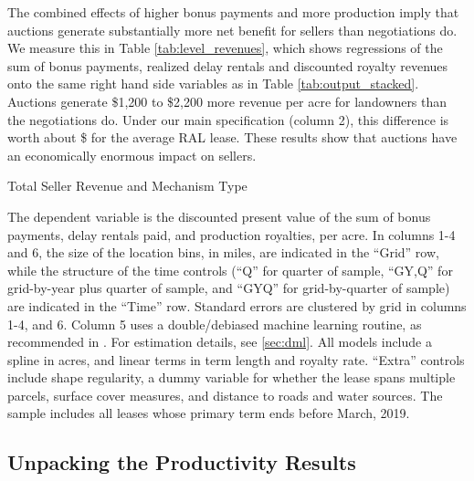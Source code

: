 \documentclass[12pt]{article}
\newcommand{\inputy}[1]{\unskip}
\begin{document}
The combined effects of higher bonus payments and more production imply that auctions generate substantially more net benefit for sellers than negotiations do.  We measure this in Table \ref{tab:level_revenues}, which shows regressions of the sum of bonus payments, realized delay rentals and discounted royalty revenues onto the same right hand side variables as in Table \ref{tab:output_stacked}.  Auctions generate \$1,200 to \$2,200 more revenue per acre for landowners than the negotiations do.  Under our main specification (column 2), this difference is worth about \$\inputy{../output/estimates/SellerRevenue_Grid10Yr_total.tex} for the average RAL lease.  These results show that auctions have an economically enormous impact on sellers.

\addtolength{\tabcolsep}{6pt}
\begin{table}[!htbp]
	\begin{center}
	\begin{threeparttable}
	\caption{Total Seller Revenue and Mechanism Type}
	\label{tab:level_revenues}
	\small
	            
		\begin{tablenotes}
		\footnotesize
		\item The dependent variable is the discounted present value of the sum of bonus payments, delay rentals paid, and production royalties, per acre.  In columns 1-4 and 6, the size of the location bins, in miles, are indicated in the ``Grid'' row, while the structure of the time controls (``Q'' for quarter of sample, ``GY,Q'' for grid-by-year plus quarter of sample, and ``GYQ'' for grid-by-quarter of sample) are indicated in the ``Time'' row.  Standard errors are clustered by grid in columns 1-4, and 6.  Column 5 uses a double/debiased machine learning routine, as recommended in  \cite{chernozhukov2018double}.  For estimation details, see \ref{sec:dml}.  All models include a spline in acres, and linear terms in term length and  royalty rate.  ``Extra'' controls include shape regularity, a dummy variable for whether the lease spans multiple parcels, surface cover measures, and distance to roads and water sources.  The sample includes all leases whose primary term ends before March, 2019.      
		\end{tablenotes}	   
	\end{threeparttable}
	\end{center}
\end{table}
\addtolength{\tabcolsep}{-6pt}

\subsection{Unpacking the Productivity Results}
\end{document}
